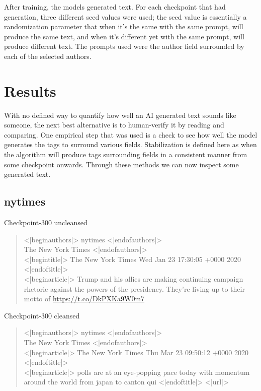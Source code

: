\documentclass[11pt]{article}
\begin{document}
After training, the models generated text. For each checkpoint that had generation, three different seed
values were used; the seed value is essentially a randomization parameter that when it's the same with the
same prompt, will produce the same text, and when it's different yet with the same prompt, will produce 
different text. The prompts used were the author field surrounded by each of the selected authors. 

\section{Results}
\label{sec:org68d3298}

With no defined way to quantify how well an AI generated text sounds like someone, the next best 
alternative is to human-verify it by reading and comparing. One empirical step that was used is
a check to see how well the model generates the tags to surround various fields. Stabilization is
defined here as when the algorithm will produce tags surrounding fields in a consistent manner from
some checkpoint onwards. Through these methods we can now inspect some generated text.

\subsection{nytimes}
\label{sec:org8928284}

Checkpoint-300 uncleansed 

\begin{quote}
<|beginauthors|> nytimes <|endofauthors|> \\
The New York Times <|endofauthors|> \\
<|begintitle|>  The New York Times Wed Jan 23 17:30:05 +0000 2020 <|endoftitle|> \\
<|beginarticle|>  Trump and his allies are making continuing campaign rhetoric against the powers of the presidency. They're living up to their motto of  \url{https://t.co/DkPXKa9W0m7}
\end{quote}

\noindent
Checkpoint-300 cleansed 

\begin{quote}
<|beginauthors|> nytimes <|endofauthors|>  \\
The New York Times <|endofauthors|> \\
<|beginarticle|>  The New York Times Thu Mar 23 09:50:12 +0000 2020 <|endoftitle|> \\
<|beginarticle|>  polls are at an eye-popping pace today with momentum around the world from japan to canton qui <|endoftitle|> <|url|>
\end{quote}
\end{document}
